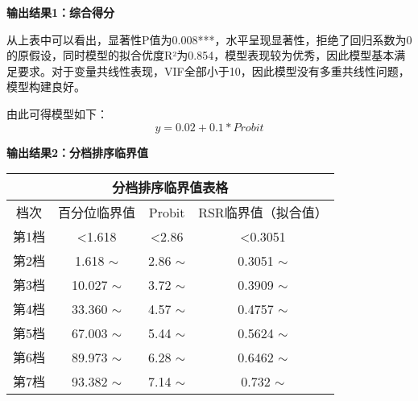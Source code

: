 \documentclass[withoutpreface,bwprint]{cumcmthesis} %
\begin{document}
\textbf{输出结果1：综合得分}

\begin{table}[htbp]
\end{table}

从上表中可以看出，显著性P值为0.008***，水平呈现显著性，拒绝了回归系数为0的原假设，同时模型的拟合优度R²为0.854，模型表现较为优秀，因此模型基本满足要求。对于变量共线性表现，VIF全部小于10，因此模型没有多重共线性问题，模型构建良好。

由此可得模型如下：
\begin{equation}
y = 0.02 + 0.1*Probit
\end{equation}

\textbf{输出结果2：分档排序临界值}

\begin{table}[htbp]
\centering
\begin{tabular}{cccc}
\hline
\multicolumn{4}{c}{分档排序临界值表格}                                \\ \hline
档次  & 百分位临界值           & Probit          & RSR临界值（拟合值）       \\ \hline
第1档 & \textless{}1.618 & \textless{}2.86 & \textless{}0.3051 \\
第2档 & 1.618 $\sim$     & 2.86 $\sim$     & 0.3051 $\sim$     \\
第3档 & 10.027 $\sim$    & 3.72 $\sim$     & 0.3909 $\sim$     \\
第4档 & 33.360 $\sim$    & 4.57 $\sim$     & 0.4757 $\sim$     \\
第5档 & 67.003 $\sim$    & 5.44 $\sim$     & 0.5624 $\sim$     \\
第6档 & 89.973 $\sim$    & 6.28 $\sim$     & 0.6462 $\sim$     \\
第7档 & 93.382 $\sim$    & 7.14 $\sim$     & 0.732 $\sim$      \\ \hline
\end{tabular}
\end{table}
\end{document}
